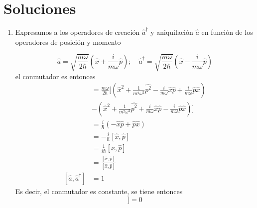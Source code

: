 \section*{Soluciones}
\setcounter{equation}{0}

\begin{enumerate}
\item Expresamos a los operadores de creación $\hat{a}^\dagger$ y aniquilación $\hat{a}$ en función de los operadores de posición y momento

\begin{equation*}
\hat{a} = \sqrt{\frac{m\omega}{2\hbar}}\left( \hat{x} + \frac{i}{m\omega}\hat{p} \right); \quad \hat{a}^\dagger = \sqrt{\frac{m\omega}{2\hbar}}\left( \hat{x} - \frac{i}{m\omega}\hat{p} \right)
\end{equation*}
el conmutador es entonces
\begin{align*}
[\hat{a}, \hat{a}^\dagger] & = \frac{m\omega}{2\hbar} \Bigg[ \left( \hat{x}^2 + \frac{1}{m^2\omega^2}\hat{p^2} - \frac{i}{m\omega}\hat{x}\hat{p} + \frac{i}{m\omega}\hat{p}\hat{x} \right) \\ &- \left( \hat{x}^2 + \frac{1}{m^2\omega^2}\hat{p^2} + \frac{i}{m\omega}\hat{x}\hat{p} - \frac{i}{m\omega}\hat{p}\hat{x} \right) \Bigg] \\
& = \frac{i}{\hbar}\left(-\hat{x}\hat{p} + \hat{p}\hat{x}\right)                                                                                                \\
& = -\frac{i}{\hbar}[\hat{x}, \hat{p}]                                                                                                                          \\
& = \frac{1}{i\hbar}[\hat{x}, \hat{p}]                                                                                                                          \\
& = \frac{[\hat{x}, \hat{p}]}{[\hat{x}, \hat{p}]}                                                                                                               \\
[\hat{a}, \hat{a}^\dagger] & = 1
\end{align*}
Es decir, el conmutador es constante, se tiene entonces
\begin{equation*}
[\hat{A}, [\hat{a}, \hat{a}^{\dagger}]] = 0
\end{equation*}


\end{enumerate}
